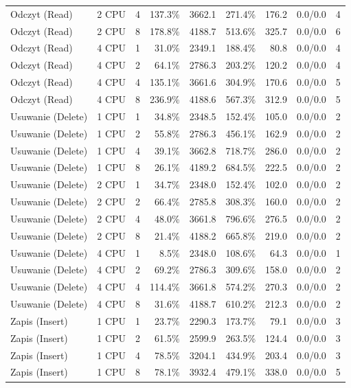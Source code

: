 \begin{table}[ht]
{\begin{tabular}{llcrrrrcc}
Odczyt (Read) & 2 CPU & 4 & 137.3\% & 3662.1 & 271.4\% & 176.2 & 0.0/0.0 & 4 \\
Odczyt (Read) & 2 CPU & 8 & 178.8\% & 4188.7 & 513.6\% & 325.7 & 0.0/0.0 & 6 \\
Odczyt (Read) & 4 CPU & 1 & 31.0\% & 2349.1 & 188.4\% & 80.8 & 0.0/0.0 & 4 \\
Odczyt (Read) & 4 CPU & 2 & 64.1\% & 2786.3 & 203.2\% & 120.2 & 0.0/0.0 & 4 \\
Odczyt (Read) & 4 CPU & 4 & 135.1\% & 3661.6 & 304.9\% & 170.6 & 0.0/0.0 & 5 \\
Odczyt (Read) & 4 CPU & 8 & 236.9\% & 4188.6 & 567.3\% & 312.9 & 0.0/0.0 & 5 \\
Usuwanie (Delete) & 1 CPU & 1 & 34.8\% & 2348.5 & 152.4\% & 105.0 & 0.0/0.0 & 2 \\
Usuwanie (Delete) & 1 CPU & 2 & 55.8\% & 2786.3 & 456.1\% & 162.9 & 0.0/0.0 & 2 \\
Usuwanie (Delete) & 1 CPU & 4 & 39.1\% & 3662.8 & 718.7\% & 286.0 & 0.0/0.0 & 2 \\
Usuwanie (Delete) & 1 CPU & 8 & 26.1\% & 4189.2 & 684.5\% & 222.5 & 0.0/0.0 & 2 \\
Usuwanie (Delete) & 2 CPU & 1 & 34.7\% & 2348.0 & 152.4\% & 102.0 & 0.0/0.0 & 2 \\
Usuwanie (Delete) & 2 CPU & 2 & 66.4\% & 2785.8 & 308.3\% & 160.0 & 0.0/0.0 & 2 \\
Usuwanie (Delete) & 2 CPU & 4 & 48.0\% & 3661.8 & 796.6\% & 276.5 & 0.0/0.0 & 2 \\
Usuwanie (Delete) & 2 CPU & 8 & 21.4\% & 4188.2 & 665.8\% & 219.0 & 0.0/0.0 & 2 \\
Usuwanie (Delete) & 4 CPU & 1 & 8.5\% & 2348.0 & 108.6\% & 64.3 & 0.0/0.0 & 1 \\
Usuwanie (Delete) & 4 CPU & 2 & 69.2\% & 2786.3 & 309.6\% & 158.0 & 0.0/0.0 & 2 \\
Usuwanie (Delete) & 4 CPU & 4 & 114.4\% & 3661.8 & 574.2\% & 270.3 & 0.0/0.0 & 2 \\
Usuwanie (Delete) & 4 CPU & 8 & 31.6\% & 4188.7 & 610.2\% & 212.3 & 0.0/0.0 & 2 \\
Zapis (Insert) & 1 CPU & 1 & 23.7\% & 2290.3 & 173.7\% & 79.1 & 0.0/0.0 & 3 \\
Zapis (Insert) & 1 CPU & 2 & 61.5\% & 2599.9 & 263.5\% & 124.4 & 0.0/0.0 & 3 \\
Zapis (Insert) & 1 CPU & 4 & 78.5\% & 3204.1 & 434.9\% & 203.4 & 0.0/0.0 & 3 \\
Zapis (Insert) & 1 CPU & 8 & 78.1\% & 3932.4 & 479.1\% & 338.0 & 0.0/0.0 & 5 \\

\end{tabular}}
\end{table}
